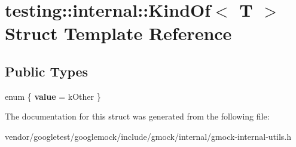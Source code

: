 \hypertarget{structtesting_1_1internal_1_1_kind_of}{}\section{testing\+:\+:internal\+:\+:Kind\+Of$<$ T $>$ Struct Template Reference}
\label{structtesting_1_1internal_1_1_kind_of}
\subsection*{Public Types}
\begin{DoxyCompactItemize}
\item 
\mbox{\label{structtesting_1_1internal_1_1_kind_of_a4866389a4bc8d5522b5f8ae61a42f520}} 
enum \{ {\bfseries value} = k\+Other
 \}
\end{DoxyCompactItemize}


The documentation for this struct was generated from the following file\+:\begin{DoxyCompactItemize}
\item 
vendor/googletest/googlemock/include/gmock/internal/gmock-\/internal-\/utils.\+h\end{DoxyCompactItemize}
